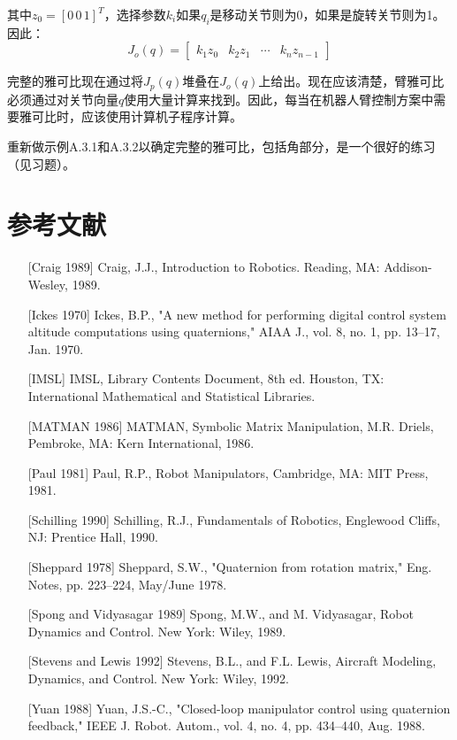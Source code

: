 \documentclass[UTF8,a4paper]{ctexart}
\begin{document}
其中$z_0 = [0 \, 0 \, 1]^T$，选择参数$k_i$如果$q_i$是移动关节则为0，如果是旋转关节则为1。因此：
\begin{equation}
J_o(q) = \begin{bmatrix} k_1z_0 & k_2z_1 & \cdots & k_nz_{n-1} \end{bmatrix}
\tag{A.3.36}
\end{equation}

完整的雅可比现在通过将$J_p(q)$堆叠在$J_o(q)$上给出。现在应该清楚，臂雅可比必须通过对关节向量$q$使用大量计算来找到。因此，每当在机器人臂控制方案中需要雅可比时，应该使用计算机子程序计算。

重新做示例A.3.1和A.3.2以确定完整的雅可比，包括角部分，是一个很好的练习（见习题）。

\section*{参考文献}

\begin{enumerate}
    \item[{[Craig 1989]}] Craig, J.J., Introduction to Robotics. Reading, MA: Addison-Wesley, 1989.
    
    \item[{[Ickes 1970]}] Ickes, B.P., "A new method for performing digital control system altitude computations using quaternions," AIAA J., vol. 8, no. 1, pp. 13--17, Jan. 1970.
    
    \item[{[IMSL]}] IMSL, Library Contents Document, 8th ed. Houston, TX: International Mathematical and Statistical Libraries.
    
    \item[{[MATMAN 1986]}] MATMAN, Symbolic Matrix Manipulation, M.R. Driels, Pembroke, MA: Kern International, 1986.
    
    \item[{[Paul 1981]}] Paul, R.P., Robot Manipulators, Cambridge, MA: MIT Press, 1981.
    
    \item[{[Schilling 1990]}] Schilling, R.J., Fundamentals of Robotics, Englewood Cliffs, NJ: Prentice Hall, 1990.
    
    \item[{[Sheppard 1978]}] Sheppard, S.W., "Quaternion from rotation matrix," Eng. Notes, pp. 223--224, May/June 1978.
    
    \item[{[Spong and Vidyasagar 1989]}] Spong, M.W., and M. Vidyasagar, Robot Dynamics and Control. New York: Wiley, 1989.
    
    \item[{[Stevens and Lewis 1992]}] Stevens, B.L., and F.L. Lewis, Aircraft Modeling, Dynamics, and Control. New York: Wiley, 1992.
    
    \item[{[Yuan 1988]}] Yuan, J.S.-C., "Closed-loop manipulator control using quaternion feedback," IEEE J. Robot. Autom., vol. 4, no. 4, pp. 434--440, Aug. 1988.
\end{enumerate}

\ifstandalone
  
\end{document}
